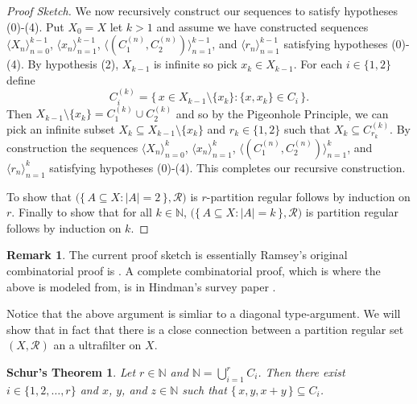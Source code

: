 \documentclass[12pt]{article}
\theoremstyle{plain}
\newtheorem*{schur}{Schur's Theorem}
\theoremstyle{definition}
\newtheorem{rmk}[thm]{Remark}
\newcommand{\la}{\langle}
\newcommand{\ra}{\rangle}
\newcommand{\bbN}{\mathbb{N}}
\newcommand{\calR}{\mathcal{R}}
\begin{document}
\begin{proof}[Proof Sketch]
  We now recursively construct our sequences to satisfy hypotheses
  (0)-(4). 
  Put $X_0 = X$ let $k > 1$ and assume we have constructed sequences
  $\la X_n \ra_{n=0}^{k-1}$, $\la x_n \ra_{n=1}^{k-1}$, $\bigl\la
  (C_1^{(n)}, C_2^{(n)}) \bigr\ra_{n=1}^{k-1}$, and $\la r_n
  \ra_{n=1}^{k-1}$ satisfying hypotheses (0)-(4).
  By hypothesis (2), $X_{k-1}$ is infinite so pick $x_k \in X_{k-1}$.  
  For each $i \in \{1, 2\}$ define
  \[
    C_i^{(k)} = \bigl\{\, x \in X_{k-1} \setminus \{x_k\} : \{x, x_k\} \in
    C_i \,\bigr\}.
  \]
  Then $X_{k-1} \setminus \{x_k\}= C_1^{(k)} \cup C_2^{(k)}$ and so by the Pigeonhole
  Principle, we can pick an infinite subset $X_k \subseteq X_{k-1}
  \setminus \{x_k\}$ and $r_k \in \{1, 2\}$ such that $X_k \subseteq
  C_{r_k}^{(k)}$. 
  By construction the sequences $\la X_n \ra_{n=0}^k$, $\la x_n
  \ra_{n=1}^k$, $\bigl\la (C_1^{(n)}, C_2^{(n)})
  \bigr\ra_{n=1}^k$, and $\la r_n \ra_{n=1}^k$ satisfying
  hypotheses (0)-(4).
  This completes our recursive construction.

  To show that $\bigl(\{\, A \subseteq X : |A| = 2 \,\}, \calR\bigr)$
  is \mbox{$r$-partition} regular follows by induction on $r$. 
  Finally to show that for all $k \in \bbN$, $\bigl(\{\, A \subseteq X
  : |A| = k \,\}, \calR\bigr)$ is partition regular follows by
  induction on $k$.
\end{proof}
\begin{rmk}
  The current proof sketch is essentially Ramsey's original
  combinatorial proof is \cite[Theorem A]{Ramsey:1930uq}. 
  A complete combinatorial proof, which is where the above is modeled
  from, is in Hindman's survey paper \cite[Theorem
  \textcolor{red}{??}]{Hindman:1979fk}.
\end{rmk}

Notice that the above argument is simliar to a diagonal
type-argument. 
We will show that in fact that there is a close connection between a
partition regular set $(X, \calR)$ an a ultrafilter on $X$. 


\begin{schur}
  Let $r \in \bbN$ and $\bbN = \bigcup_{i=1}^r C_i$.
  Then there exist $i \in \{1, 2, \ldots, r\}$ and $x$, $y$, and $z
  \in \bbN$ such that $\{\, x, y, x+y \,\} \subseteq C_i$.
\end{schur}
\end{document}
